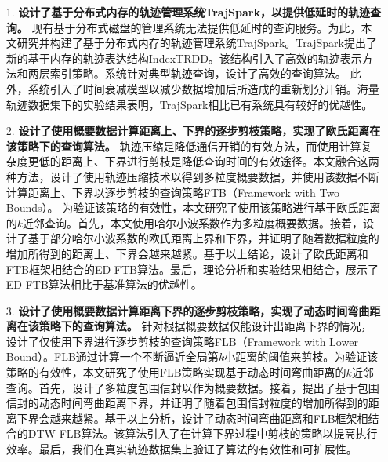 \begin{itemize}
	\item[1.]\textbf{设计了基于分布式内存的轨迹管理系统TrajSpark，以提供低延时的轨迹查询。}
	现有基于分布式磁盘的管理系统无法提供低延时的查询服务。为此，本文研究并构建了基于分布式内存的轨迹管理系统TrajSpark。TrajSpark提出了新的基于内存的轨迹表达结构IndexTRDD。该结构引入了高效的轨迹表示方法和两层索引策略。系统针对典型轨迹查询，设计了高效的查询算法。
	此外，系统引入了时间衰减模型以减少数据增加后所造成的重新划分开销。海量轨迹数据集下的实验结果表明，TrajSpark相比已有系统具有较好的优越性。
	
	\item [2.]\textbf{设计了使用概要数据计算距离上、下界的逐步剪枝策略，实现了欧氏距离在该策略下的查询算法。}
	轨迹压缩是降低通信开销的有效方法，而使用计算复杂度更低的距离上、下界进行剪枝是降低查询时间的有效途径。本文融合这两种方法，设计了使用轨迹压缩技术以得到多粒度概要数据，并使用该数据不断计算距离上、下界以逐步剪枝的查询策略FTB（Framework with Two Bounds）。
	为验证该策略的有效性，本文研究了使用该策略进行基于欧氏距离的$k$近邻查询。首先，本文使用哈尔小波系数作为多粒度概要数据。接着，设计了基于部分哈尔小波系数的欧氏距离上界和下界，并证明了随着数据粒度的增加所得到的距离上、下界会越来越紧。基于以上结论，设计了欧氏距离和FTB框架相结合的ED-FTB算法。最后，理论分析和实验结果相结合，展示了ED-FTB算法相比于基准算法的优越性。
	
	
	
	\item [3.]\textbf{设计了使用概要数据计算距离下界的逐步剪枝策略，实现了动态时间弯曲距离在该策略下的查询算法。}
	针对根据概要数据仅能设计出距离下界的情况，设计了仅使用下界进行逐步剪枝的查询策略FLB（Framework with Lower Bound）。FLB通过计算一个不断逼近全局第$k$小距离的阈值来剪枝。为验证该策略的有效性，本文研究了使用FLB策略实现基于动态时间弯曲距离的$k$近邻查询。首先，设计了多粒度包围信封以作为概要数据。接着，提出了基于包围信封的动态时间弯曲距离下界，并证明了随着包围信封粒度的增加所得到的距离下界会越来越紧。基于以上分析，设计了动态时间弯曲距离和FLB框架相结合的DTW-FLB算法。该算法引入了在计算下界过程中剪枝的策略以提高执行效率。最后，我们在真实轨迹数据集上验证了算法的有效性和可扩展性。
	
	

\end{itemize}

